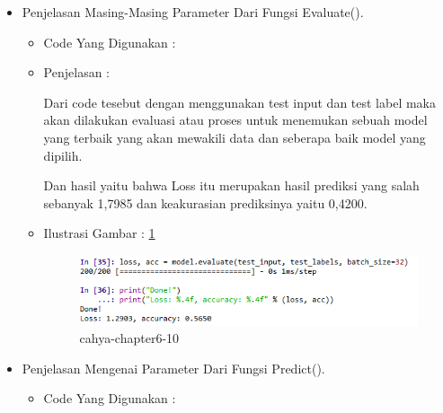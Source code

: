 \begin{enumerate}
\begin{itemize}
\begin{itemize}
\begin{figure}[!hbtp]
\end{figure}
\par
\end{itemize}
\par
\par
\par
\par
\item Penjelasan Masing-Masing Parameter Dari Fungsi Evaluate().
\begin{itemize}
\item Code Yang Digunakan :
\par

\par
\item Penjelasan :
\par Dari code tesebut dengan menggunakan test input dan test label maka akan dilakukan evaluasi atau proses untuk menemukan sebuah model yang terbaik yang akan mewakili data dan seberapa baik model yang dipilih.
\par Dan hasil yaitu bahwa Loss itu merupakan hasil prediksi yang salah sebanyak 1,7985 dan keakurasian prediksinya yaitu 0,4200.
\par
\par
\item Ilustrasi Gambar : \ref{cahya-chapter6-10}
\par
\begin{figure}[!hbtp]
\centering
\includegraphics[scale=0.2]{figures/cahya-cahpter-6-10.png}
\caption{cahya-chapter6-10}
\label{cahya-chapter6-10}
\end{figure}
\par
\par
\par
\par
\par
\end{itemize}
\item Penjelasan Mengenai Parameter Dari Fungsi Predict().
\begin{itemize}
\item Code Yang Digunakan :
\par

\par

\end{itemize}
\end{itemize}
\end{enumerate}
